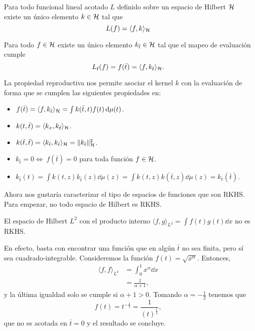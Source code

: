 \begin{theorem}
	Para todo funcional lineal acotado \(L\) definido sobre un espacio de Hilbert \(\mathcal{H}\) existe un único elemento \(k \in \mathcal{H}\) tal que
	\begin{equation*}
		L(f) = \langle f, k\rangle_{\mathcal{H}}
	\end{equation*}
\end{theorem}

\begin{corollary} Para todo \(f \in \mathcal{H}\) existe un único elemento \(k_{\bar{t}} \in \mathcal{H}\) tal que el mapeo de evaluación cumple
	\begin{equation*}
		L_{\bar{t}}(f) = f(\bar{t}) = \langle f, k_{\bar{t}}\rangle_{\mathcal{H}}.
	\end{equation*}
\end{corollary}

La propiedad reproductiva nos permite asociar el kernel \(k\) con la evaluación de forma que se cumplen las siguientes propiedades en:
\begin{itemize}
	\item \(f(\bar{t}) = \langle f, k_{\bar{t}}\rangle_{\mathcal{H}} = \int k(\bar{t}, t) f(t) \dd{\mu(t)}\).
	\item \(k(t, \bar{t}) = \langle k_{x}, k_{\bar{t}} \rangle_{\mathcal{H}}\).
	\item \(k(\bar{t}, \bar{t}) = \langle k_{\bar{t}}, k_{\bar{t}}\rangle_{\mathcal{H}} = \Vert k_{\bar{t}} \Vert_{\mathcal{H}}^{2}\).
	\item \(k_{\bar{t}} = 0 \iff \ f(\bar{t}) = 0\) para toda función \(f \in \mathcal{H}\).
	\item \(k_{\bar{t}}(t) = \int k(t, z) k_{\bar{t}}(z) \dd{\mu(z)} = \int k(t, z) k(\bar{t}, z) \dd{\mu(z)} = k_{t}(\bar{t}) \).
\end{itemize}

Ahora nos gustaría caracterizar el tipo de espacios de funciones que son RKHS. Para empezar, no todo espacio de Hilbert es RKHS.
\begin{proposition}
	El espacio de Hilbert \(L^{2}\) con el producto interno \(\langle f, g\rangle_{L^{2}} = \int f(t) g(t) \dd{x}\) no es RKHS.
\end{proposition}

En efecto, basta con encontrar una función que en algún \(\bar{t}\) no sea finita, pero sí sea cuadrado-integrable. Consideremos la función \( f(t) = \sqrt{x^\alpha} \). Entonces,
\begin{align*}
	\langle f, f \rangle_{L^{2}}	&= \int_{0}^{1} x^\alpha \dd{x} \\
									&= \frac{1}{\alpha + 1},
\end{align*}
y la última igualdad solo se cumple si \(\alpha + 1 > 0\). Tomando \(\alpha =-\frac{1}{2}\) tenemos que
\[f(t) = t^{-\frac{1}{4}} = \frac{1}{(t)^{\frac{1}{4}}},\]
que no es acotada en \(\bar{t} = 0\) y el resultado se concluye.


